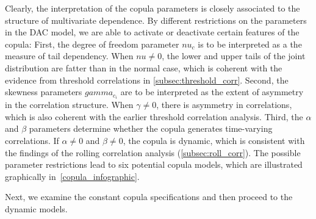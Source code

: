 Clearly, the interpretation of the copula parameters is closely associated to the structure of multivariate dependence. By different restrictions on the parameters in the DAC model, we are able to activate or deactivate certain features of the copula: First, the degree of freedom parameter $nu_c$ is to be interpreted as a the measure of tail dependency. When $nu \neq 0$, the lower and upper tails of the joint distribution are fatter than in the normal case, which is coherent with the evidence from threshold correlations in \autoref{subsec:threshold_corr}. Second, the skewness parameters $gamma_{c_i}$ are to be interpreted as the extent of asymmetry in the correlation structure. When $\gamma \neq 0$, there is asymmetry in correlations, which is also coherent with the earlier threshold correlation analysis. Third, the $\alpha$ and $\beta$ parameters determine whether the copula generates time-varying correlations. If $\alpha \neq 0$ and $\beta \neq 0$, the copula is dynamic, which is consistent with the findings of the rolling correlation analysis (\autoref{subsec:roll_corr}). The possible parameter restrictions lead to six potential copula models, which are illustrated graphically in~\autoref{copula_infographic}.

Next, we examine the constant copula specifications and then proceed to the dynamic models.

